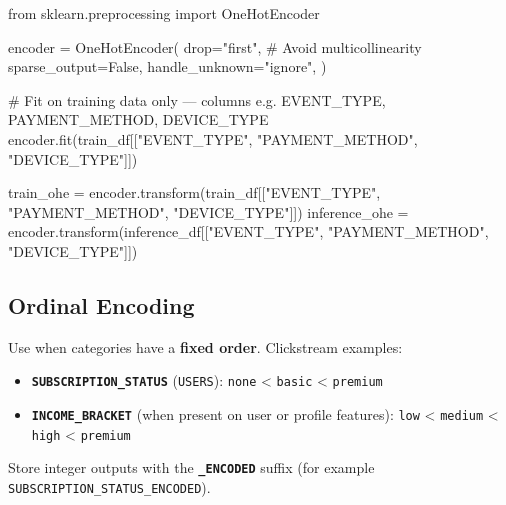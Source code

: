 \documentclass[
  letterpaper,
  DIV=11,
  numbers=noendperiod]{scrreprt}
\newenvironment{Shaded}{\begin{snugshade}}{\end{snugshade}}
\newcommand{\CommentTok}[1]{\textcolor[rgb]{0.37,0.37,0.37}{#1}}
\newcommand{\ImportTok}[1]{\textcolor[rgb]{0.00,0.46,0.62}{#1}}
\newcommand{\NormalTok}[1]{\textcolor[rgb]{0.00,0.23,0.31}{#1}}
\newcommand{\OperatorTok}[1]{\textcolor[rgb]{0.37,0.37,0.37}{#1}}
\newcommand{\StringTok}[1]{\textcolor[rgb]{0.13,0.47,0.30}{#1}}
\newcommand{\VariableTok}[1]{\textcolor[rgb]{0.07,0.07,0.07}{#1}}
\providecommand{\tightlist}{%
  \setlength{\itemsep}{0pt}\setlength{\parskip}{0pt}}\usepackage{longtable,booktabs,array}
\begin{document}
\begin{Shaded}
\begin{Highlighting}[]
\ImportTok{from}\NormalTok{ sklearn.preprocessing }\ImportTok{import}\NormalTok{ OneHotEncoder}

\NormalTok{encoder }\OperatorTok{=}\NormalTok{ OneHotEncoder(}
\NormalTok{    drop}\OperatorTok{=}\StringTok{"first"}\NormalTok{,  }\CommentTok{\# Avoid multicollinearity}
\NormalTok{    sparse\_output}\OperatorTok{=}\VariableTok{False}\NormalTok{,}
\NormalTok{    handle\_unknown}\OperatorTok{=}\StringTok{"ignore"}\NormalTok{,}
\NormalTok{)}

\CommentTok{\# Fit on training data only — columns e.g. EVENT\_TYPE, PAYMENT\_METHOD, DEVICE\_TYPE}
\NormalTok{encoder.fit(train\_df[[}\StringTok{"EVENT\_TYPE"}\NormalTok{, }\StringTok{"PAYMENT\_METHOD"}\NormalTok{, }\StringTok{"DEVICE\_TYPE"}\NormalTok{]])}

\NormalTok{train\_ohe }\OperatorTok{=}\NormalTok{ encoder.transform(train\_df[[}\StringTok{"EVENT\_TYPE"}\NormalTok{, }\StringTok{"PAYMENT\_METHOD"}\NormalTok{, }\StringTok{"DEVICE\_TYPE"}\NormalTok{]])}
\NormalTok{inference\_ohe }\OperatorTok{=}\NormalTok{ encoder.transform(inference\_df[[}\StringTok{"EVENT\_TYPE"}\NormalTok{, }\StringTok{"PAYMENT\_METHOD"}\NormalTok{, }\StringTok{"DEVICE\_TYPE"}\NormalTok{]])}
\end{Highlighting}
\end{Shaded}

\hypertarget{ordinal-encoding}{%
\subsection{Ordinal Encoding}\label{ordinal-encoding}}

Use when categories have a \textbf{fixed order}. Clickstream examples:

\begin{itemize}
\tightlist
\item
  \textbf{\texttt{SUBSCRIPTION\_STATUS}} (\texttt{USERS}): \texttt{none}
  \textless{} \texttt{basic} \textless{} \texttt{premium}
\item
  \textbf{\texttt{INCOME\_BRACKET}} (when present on user or profile
  features): \texttt{low} \textless{} \texttt{medium} \textless{}
  \texttt{high} \textless{} \texttt{premium}
\end{itemize}

Store integer outputs with the \textbf{\texttt{\_ENCODED}} suffix (for
example \texttt{SUBSCRIPTION\_STATUS\_ENCODED}).
\end{document}
